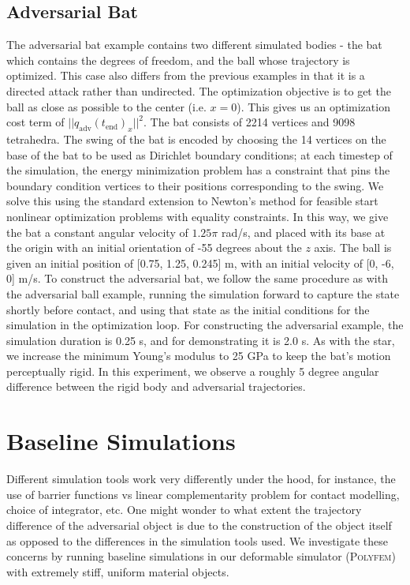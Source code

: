 \subsection{Adversarial Bat}
The adversarial bat example contains two different simulated bodies - the bat which contains the degrees of freedom, and the ball whose trajectory is optimized. This case also differs from the previous examples in that it is a directed attack rather than undirected. The optimization objective is to get the ball as close as possible to the center (i.e. $x= 0$). This gives us an optimization cost term of $ || q_\text{adv}(t_\text{end})_x ||^2 $. The bat consists of 2214 vertices and 9098 tetrahedra. The swing of the bat is encoded by choosing the 14 vertices on the base of the bat to be used as Dirichlet boundary conditions; at each timestep of the simulation, the energy minimization problem has a constraint that pins the boundary condition vertices to their positions corresponding to the swing. We solve this using the standard extension to Newton's method for feasible start nonlinear optimization problems with equality constraints. In this way, we give the bat a constant angular velocity of $1.25 \pi$ rad/s, and placed with its base at the origin with an initial orientation of -55 degrees about the $z$ axis. The ball is given an initial position of  [0.75, 1.25, 0.245] m, with an initial velocity of  [0,  -6,  0] m/s. To construct the adversarial bat, we follow the same procedure as with the adversarial ball example, running the simulation forward to capture the state shortly before contact, and using that state as the initial conditions for the simulation in the optimization loop. For constructing the adversarial example, the simulation duration is 0.25 s, and for demonstrating it is 2.0 s. As with the star, we increase the minimum Young's modulus to 25 GPa to keep the bat's motion perceptually rigid. In this experiment, we observe a roughly 5 degree angular difference between the rigid body and adversarial trajectories.

\section{Baseline Simulations}
Different simulation tools work very differently under the hood, for instance, the use of barrier functions vs linear complementarity problem for contact modelling, choice of integrator, etc. 
One might wonder to what extent the trajectory difference of the adversarial object is due to the construction of the object itself as opposed to the differences in the simulation tools used. We investigate these concerns by running baseline simulations in our deformable simulator (\textsc{Polyfem}) with extremely stiff, uniform material objects.

